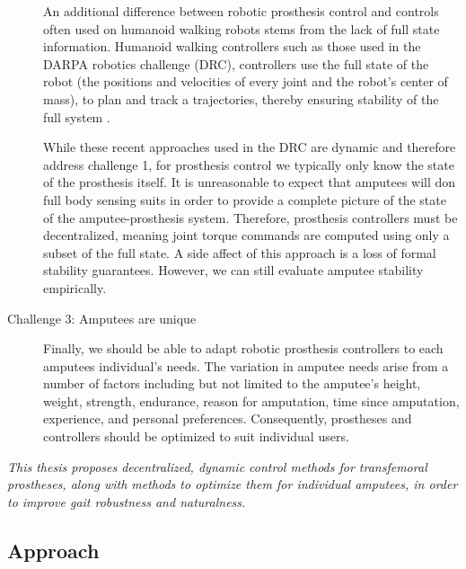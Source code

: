 \begin{description}
    An additional difference between robotic prosthesis control and controls
    often used on humanoid walking robots stems from the lack of full state
    information. Humanoid walking controllers such as those used in the DARPA
    robotics challenge (DRC), controllers use the full state of the robot (\ie the
    positions and velocities of every joint and the robot's center of mass), to
    plan and track a trajectories, thereby ensuring stability of the full system
    \citep{feng2015optimization, kuindersma2014efficiently,
    englsberger2014trajectory}.
    
    While these recent approaches used in the DRC are dynamic and therefore
    address challenge 1, for prosthesis control we typically only know the state
    of the prosthesis itself. It is unreasonable to expect that amputees will
    don full body sensing suits in order to provide a complete picture of the
    state of the amputee-prosthesis system. Therefore, prosthesis controllers
    must be decentralized, meaning joint torque commands are computed using only
    a subset of the full state. A side affect of this approach is a loss of
    formal stability guarantees. However, we can still evaluate amputee
    stability empirically.

    \item[Challenge 3: Amputees are unique]
    
    Finally, we should be able to adapt robotic prosthesis controllers to each
    amputees individual's needs. The variation in amputee needs arise from a
    number of factors including but not limited to the amputee's height, weight,
    strength, endurance, reason for amputation, time since amputation, 
    experience, and personal preferences. Consequently, prostheses and
    controllers should be optimized to suit individual users.
\end{description}

\begin{fullwidth}
\emph{This thesis proposes decentralized, dynamic control methods for
transfemoral prostheses, along with methods to optimize them for individual
amputees, in order to improve gait robustness and naturalness.}
\end{fullwidth}

\subsection{Approach}


